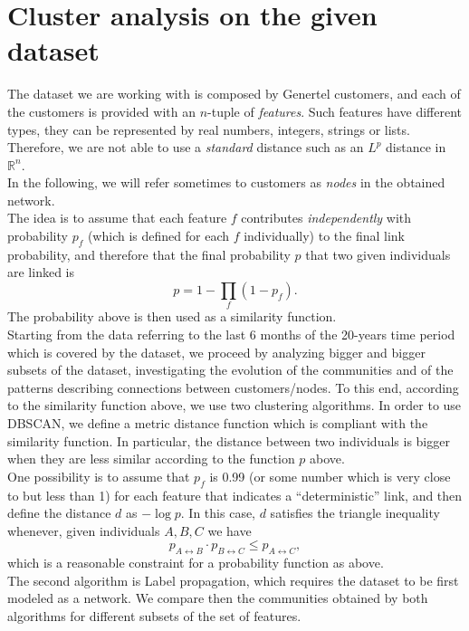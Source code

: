\documentclass[a4paper,11pt]{book}
\begin{document}
\section{Cluster analysis on the given dataset}
The dataset we are working with is composed by Genertel customers, and each of the customers is provided with an $n$-tuple of \textit{features}. Such features have different types, they can be represented by real numbers, integers, strings or lists. Therefore, we are not able to use a \textit{standard} distance such as an $L^p$ distance in $\mathbb{R}^n$.\\
In the following, we will refer sometimes to customers as \textit{nodes} in the obtained network.\\
The idea is to assume that each feature $f$ contributes \textit{independently} with probability $p_f$ (which is defined for each $f$ individually) to the final link probability, and therefore that the final probability $p$ that two given individuals are linked is
$$
p =1-\prod_f(1-p_f).
$$
The probability above is then used as a similarity function.\\


Starting from the data referring to the last 6 months of the 20-years time period which is covered by the dataset, we proceed by analyzing bigger and bigger subsets of the dataset, investigating the evolution of the communities and of the patterns describing connections between customers/nodes. To this end, according to the similarity function above, we use two clustering algorithms. In order to use DBSCAN, we define a metric distance function which is compliant with the similarity function. In particular, the distance between two individuals is bigger when they are less similar according to the function $p$ above.\\
One possibility is to assume that $p_f$ is 0.99 (or some number which is very close to but less than 1) for each feature that indicates a ``deterministic'' link, and then define the distance $d$ as $-\log p$. In this case, $d$ satisfies the triangle inequality whenever, given individuals $A,B,C$ we have
$$
p_{A\leftrightarrow B}\cdot p_{B\leftrightarrow C} \leq p_{A\leftrightarrow C},
$$
which is a reasonable constraint for a probability function as above.\\

The second algorithm is Label propagation\cite{lp}, which requires the dataset to be first modeled as a network. We compare then the communities obtained by both algorithms for different subsets of the set of features.\\
\end{document}
